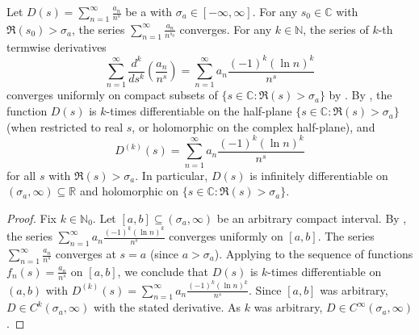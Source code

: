 \begin{corollary}
\label{corollary:termwise_differentiation_of_a_dirichlet_series_of_a_sequence_of_complex_numbers}
Let $D(s) = \sum_{n=1}^\infty \frac{a_n}{n^s}$ be a  with  $\sigma_a \in [-\infty, \infty]$.
For any $s_0 \in \mathbb{C}$ with $\Re(s_0) > \sigma_a$, the series $\sum_{n=1}^\infty \frac{a_n}{n^{s_0}}$ converges.
For any $k \in \mathbb{N}$, the series of $k$-th termwise derivatives
$$\sum_{n=1}^\infty \frac{d^k}{ds^k} \left( \frac{a_n}{n^s} \right) = \sum_{n=1}^\infty a_n \frac{(-1)^k (\ln n)^k}{n^s}$$
converges uniformly on compact subsets of $\{ s \in \mathbb{C} : \Re(s) > \sigma_a \}$ by .
By , the function $D(s)$ is $k$-times differentiable on the half-plane $\{ s \in \mathbb{C} : \Re(s) > \sigma_a \}$ (when restricted to real $s$, or holomorphic on the complex half-plane), and
$$D^{(k)}(s) = \sum_{n=1}^\infty a_n \frac{(-1)^k (\ln n)^k}{n^s}$$
for all $s$ with $\Re(s) > \sigma_a$.
In particular, $D(s)$ is infinitely differentiable on $( \sigma_a, \infty ) \subseteq \mathbb{R}$ and holomorphic on $\{ s \in \mathbb{C} : \Re(s) > \sigma_a \}$.
\end{corollary}
\begin{proof}
Fix $k \in \mathbb{N}_0$. Let $[a,b] \subseteq (\sigma_a, \infty)$ be an arbitrary compact interval.
By , the series $\sum_{n=1}^\infty a_n \frac{(-1)^k (\ln n)^k}{n^s}$ converges uniformly on $[a,b]$.
The series $\sum_{n=1}^\infty \frac{a_n}{n^s}$ converges at $s = a$ (since $a > \sigma_a$).
Applying  to the sequence of functions $f_n(s) = \frac{a_n}{n^s}$ on $[a,b]$, we conclude that $D(s)$ is $k$-times differentiable on $(a,b)$ with $D^{(k)}(s) = \sum_{n=1}^\infty a_n \frac{(-1)^k (\ln n)^k}{n^s}$.
Since $[a,b]$ was arbitrary, $D \in C^k(\sigma_a, \infty)$ with the stated derivative.
As $k$ was arbitrary, $D \in C^\infty(\sigma_a, \infty)$.
\end{proof}